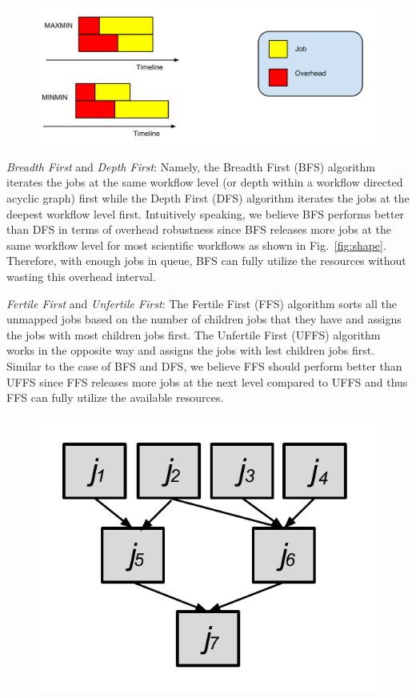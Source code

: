 \begin{figure}[htb]
\centering
 \includegraphics[width=1.0\linewidth]{figure/longest.pdf}
  \label{fig:longest}
  \vspace{-10pt}
\end{figure}
\emph{Breadth First} and \emph{Depth First}: Namely, the Breadth First (BFS) algorithm iterates the jobs at the same workflow level (or depth within a workflow directed acyclic graph) first while the Depth First (DFS) algorithm iterates the jobs at the deepest workflow level first. Intuitively speaking, we believe BFS performs better than DFS in terms of overhead robustness since BFS releases more jobs at the same workflow level for most scientific workflows as shown in Fig.~\ref{fig:shape}. Therefore, with enough jobs in queue, BFS can fully utilize the resources without wasting this overhead interval.  

\emph{Fertile First} and \emph{Unfertile First}: The Fertile First (FFS) algorithm sorts all the unmapped jobs based on the number of children jobs that they have and assigns the jobs with most children jobs first. The Unfertile First (UFFS) algorithm works in the opposite way and assigns the jobs with lest children jobs first. Similar to the case of BFS and DFS, we believe FFS should perform better than UFFS since FFS releases more jobs at the next level compared to UFFS and thus FFS can fully utilize the available resources. 

\begin{figure}[htb]
\centering
 \includegraphics[width=0.6\linewidth]{figure/impact_factor.pdf}
  \label{fig:impact}
  \vspace{-10pt}
\end{figure}

